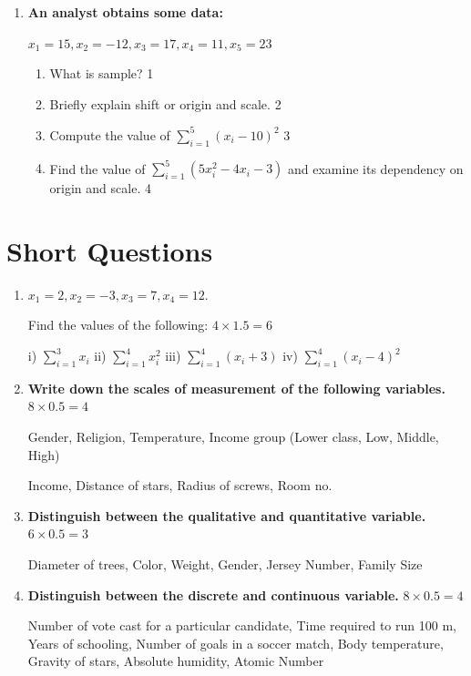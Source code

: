 \documentclass[a4paper,oneside]{book}
\begin{document}
\begin{enumerate}
\begin{enumerate}
  \end{enumerate}
  
   \item
	  \textbf{An analyst obtains some data:}
	  \begin{center}
	  $x_1=15, x_2=-12, x_3=17, x_4=11, x_5=23$
  \end{center}
  \begin{enumerate}
    \item
	What is sample? \hfill 1
    \item
	Briefly explain shift or origin and scale. \hfill 2
    \item  
	Compute the value of $\displaystyle \sum_{i=1}^5 (x_i-10)^2$ \hfill 3
    \item
	Find the value of $\displaystyle \sum_{i=1}^5 (5x_i^2-4x_i-3)$ and examine its dependency on origin and scale. \hfill 4
  \end{enumerate}

  
  \end{enumerate}

\section{Short Questions}
\begin{enumerate}
    \item
	$x_1=2, x_2=-3, x_3=7, x_4=12.$ 
	
	Find the values of the following: \hfill $4 \times 1.5 = 6$
	
	i) $\displaystyle \sum_{i=1}^3 x_i$ 
	ii) $\displaystyle \sum_{i=1}^4 x_i^2$
	iii) $\displaystyle \sum_{i=1}^4 (x_i+3)$
	iv) $\displaystyle \sum_{i=1}^4 (x_i-4)^2$
	
	
	\item \textbf{Write down the scales of measurement of the following variables.} \hfill $8 \times 0.5 = 4$

	Gender, Religion, Temperature, Income group (Lower class, Low, Middle, High)
	
Income, Distance of stars, Radius of screws, Room no.

\item \textbf{Distinguish between the qualitative and quantitative variable.} \hfill $6 \times 0.5 = 3$

Diameter of trees, Color, Weight, Gender, Jersey Number, Family Size

\item \textbf{Distinguish between the discrete and continuous variable.} \hfill $8 \times 0.5 = 4$

Number of vote cast for a particular candidate, Time required to run 100 m, Years of schooling, Number of goals in a soccer match, Body temperature, Gravity of stars, Absolute humidity, Atomic Number

\end{enumerate}
\end{document}
